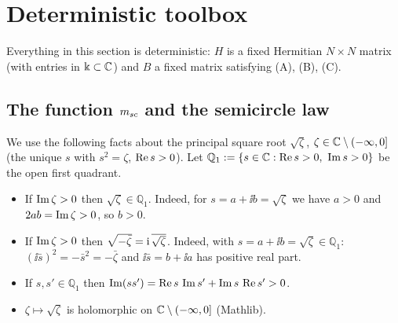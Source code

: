 \section{Deterministic toolbox}\label{sec:det}
Everything in this section is deterministic: $H$ is a fixed Hermitian $N\times N$ matrix (with entries in $\Bbbk\subset\mathbb{C}$) and $B$ a fixed matrix satisfying (A), (B), (C).

\subsection{The function $m_{sc}$ and the semicircle law}
We use the following facts about the principal square root $\sqrt\zeta$, $\zeta\in\mathbb{C}\setminus(-\infty,0]$ (the unique $s$ with $s^2=\zeta$, $\operatorname{Re} s>0$).
Let $\mathbb Q_1:=\{s\in\mathbb{C}:\operatorname{Re} s>0,\ \operatorname{Im} s>0\}$ be the open first quadrant.
\begin{itemize}[leftmargin=2em,itemsep=1pt]
\item[(S1)] If $\operatorname{Im}\zeta>0$ then $\sqrt\zeta\in\mathbb Q_1$. Indeed, for $s=a+\ii b=\sqrt\zeta$ we have $a>0$ and $2ab=\operatorname{Im}\zeta>0$, so $b>0$.
\item[(S2)] If $\operatorname{Im}\zeta>0$ then $\sqrt{-\bar\zeta}=\mathrm{i}\,\overline{\sqrt\zeta}$. Indeed, with $s=a+\ii b=\sqrt\zeta\in\mathbb Q_1$: $(\ii\bar s)^2=-\bar s^2=-\bar\zeta$ and $\ii\bar s=b+\ii a$ has positive real part.
\item[(S3)] If $s,s'\in\mathbb Q_1$ then $\operatorname{Im}(ss')=\operatorname{Re} s\,\operatorname{Im} s'+\operatorname{Im} s\,\operatorname{Re} s'>0$.
\item[(S4)] $\zeta\mapsto\sqrt\zeta$ is holomorphic on $\mathbb{C}\setminus(-\infty,0]$ (Mathlib).
\end{itemize}

